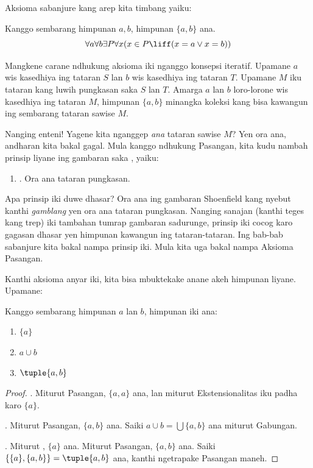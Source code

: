 \documentclass[../../../include/open-logic-section]{subfiles}
\begin{document}

Aksioma sabanjure kang arep kita timbang yaiku:

\begin{axiom}[Pasangan]
Kanggo sembarang himpunan $a, b$, himpunan $\{a, b\}$ ana.
\[
	\forall a \forall b \exists P \forall x (x \in P \liff (x = a \lor x = b))
\]
\end{axiom}

Mangkene carane ndhukung aksioma iki nganggo konsepsi
iteratif. Upamane $a$ wis kasedhiya ing tataran $S$ lan $b$
wis kasedhiya ing tataran $T$. Upamane $M$ iku tataran kang
luwih pungkasan saka $S$ lan $T$. Amarga $a$ lan $b$
loro-lorone wis kasedhiya ing tataran $M$, himpunan $\{a,b\}$
minangka koleksi kang bisa kawangun ing sembarang tataran
sawise $M$.

Nanging enteni!{} Yagene kita nganggep \emph{ana} tataran
sawise $M$? Yen ora ana, andharan kita bakal gagal.
Mula kanggo ndhukung Pasangan, kita kudu nambah prinsip
liyane ing gambaran saka , yaiku:
\begin{enumerate}
	\item[] \stagessucc. Ora ana tataran pungkasan.
\end{enumerate}
Apa prinsip iki duwe dhasar? Ora ana ing gambaran Shoenfield
kang nyebut kanthi \emph{gamblang} yen ora ana tataran
pungkasan. Nanging sanajan (kanthi teges kang trep) iki tambahan
tumrap gambaran sadurunge, prinsip iki cocog karo gagasan
dhasar yen himpunan kawangun ing tataran-tataran. Ing
bab-bab sabanjure kita bakal nampa prinsip iki. Mula kita uga
bakal nampa Aksioma Pasangan.

Kanthi aksioma anyar iki, kita bisa mbuktekake anane akeh
himpunan liyane. Upamane:

\begin{prop}
Kanggo sembarang himpunan $a$ lan $b$, himpunan iki ana:
	\begin{enumerate}
		\item{} $\{a\}$
		\item{} $a \cup b$
		\item{} $\tuple{a, b}$
	\end{enumerate}
\end{prop}

\begin{proof}
. Miturut Pasangan, $\{a, a\}$ ana,
lan miturut Ekstensionalitas iku padha karo $\{a\}$.

. Miturut Pasangan, $\{a, b\}$ ana.
Saiki $a \cup b = \bigcup \{a, b\}$ ana miturut Gabungan.

. Miturut , $\{a\}$ ana.
Miturut Pasangan, $\{a, b\}$ ana. Saiki
$\{\{a\}, \{a, b\}\} = \tuple{a, b}$ ana, kanthi
ngetrapake Pasangan maneh.
\end{proof}
\end{document}
